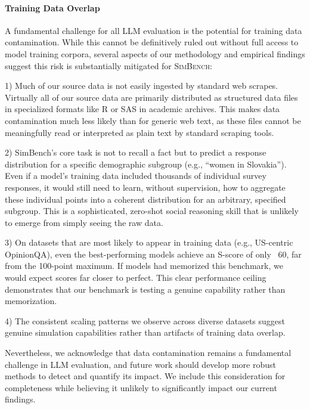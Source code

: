 \documentclass{article} %
\begin{document}
\paragraph{Training Data Overlap} 
A fundamental challenge for all LLM evaluation is the potential for training data contamination. While this cannot be definitively ruled out without full access to model training corpora, several aspects of our methodology and empirical findings suggest this risk is substantially mitigated for \textsc{SimBench}:


1) Much of our source data is not easily ingested by standard web scrapes. Virtually all of our source data are primarily distributed as structured data files in specialized formats like R or SAS in academic archives. This makes data contamination much less likely than for generic web text, as these files cannot be meaningfully read or interpreted as plain text by standard scraping tools. 

2) SimBench’s core task is not to recall a fact but to predict a response distribution for a specific demographic subgroup (e.g., ``women in Slovakia''). Even if a model's training data included thousands of individual survey responses, it would still need to learn, without supervision, how to aggregate these individual points into a coherent distribution for an arbitrary, specified subgroup. This is a sophisticated, zero-shot social reasoning skill that is unlikely to emerge from simply seeing the raw data. 

3) On datasets that are most likely to appear in training data (e.g., US-centric OpinionQA), even the best-performing models achieve an S-score of only ~60, far from the 100-point maximum. If models had memorized this benchmark, we would expect scores far closer to perfect. This clear performance ceiling demonstrates that our benchmark is testing a genuine capability rather than memorization.

4) The consistent scaling patterns we observe across diverse datasets suggest genuine simulation capabilities rather than artifacts of training data overlap. 


Nevertheless, we acknowledge that data contamination remains a fundamental challenge in LLM evaluation, and future work should develop more robust methods to detect and quantify its impact. We include this consideration for completeness while believing it unlikely to significantly impact our current findings.
\end{document}
